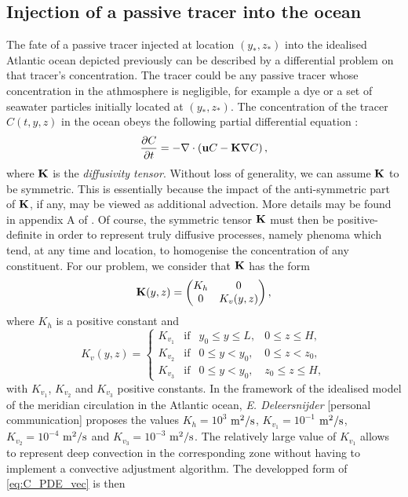 \subsection{Injection of a passive tracer into the ocean}
The fate of a passive tracer injected at location $(y_*,z_*)$ into the idealised Atlantic ocean depicted previously can be described by a differential problem on that tracer's concentration. The tracer could be any passive tracer whose concentration in the athmosphere is negligible, for example a dye or a set of seawater particles initially located at $(y_*,z_*)$. The concentration of the tracer $C(t,y,z)$ in the ocean obeys the following partial differential equation :
\begin{equation}\label{eq:C_PDE_vec}
	\frac{\partial C}{\partial t} = -\nabla \cdot \left(\b uC - \b K \nabla C\right),
\end{equation}
where $\b K$ is the \textit{diffusivity tensor}. Without loss of generality, we can assume $\b K$ to be symmetric. This is essentially because the impact of the anti-symmetric part of $\b K$, if any, may be viewed as additional advection. More details may be found in appendix A of \cite{deleersnijder2001concept}. Of course, the symmetric tensor $\b K$ must then be positive-definite in order to represent truly diffusive processes, namely phenoma which tend, at any time and location, to homogenise the concentration of any constituent. For our problem, we consider that $\b K$ has the form
\begin{equation} \label{eq:K}
	\b K(y,z) = \begin{pmatrix} K_h & 0 \\ 0 & K_v(y,z) \end{pmatrix},
\end{equation}
where $K_h$ is a positive constant and
\begin{equation} \label{eq:Kv}
	K_v(y,z) = \left\{ 
		\begin{array}{lrrr}
			K_{v_1} & \mbox{if} & y_0 \le y \le L, & 0 \le z \le H,\\
			K_{v_2} & \mbox{if} & 0 \le y < y_0, & 0 \le z < z_0,\\
			K_{v_3} & \mbox{if} & 0 \le y < y_0, & z_0 \le z \le H,
		\end{array}
	\right.
\end{equation}
with $K_{v_1}$, $K_{v_2}$ and $K_{v_3}$ positive constants. In the framework of the idealised model of the meridian circulation in the Atlantic ocean, \textit{E. Deleersnijder} [personal communication] proposes the values $K_h = 10^3$ $\rm{m^2/s}$, $K_{v_1} = 10^{-1}$ $\rm{m^2/s}$, $K_{v_2} = 10^{-4}$ $\rm{m^2/s}$ and $K_{v_3} = 10^{-3}$ $\rm{m^2/s}$. The relatively large value of $K_{v_1}$ allows to represent deep convection in the corresponding zone without having to implement a convective adjustment algorithm. The developped form of \eqref{eq:C_PDE_vec} is then
